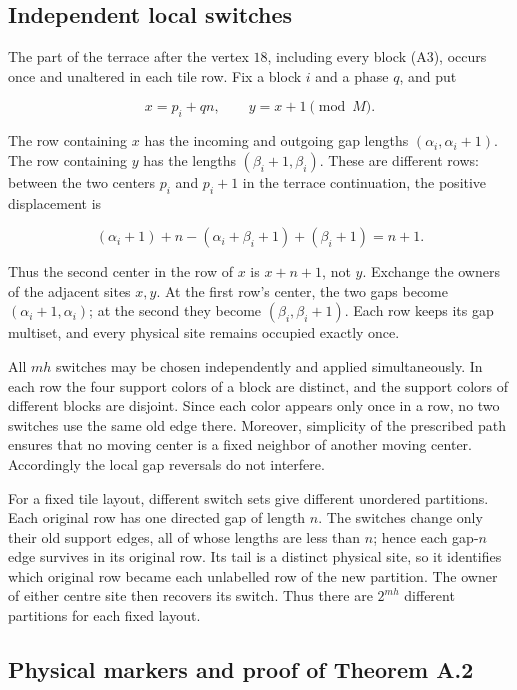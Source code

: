 \documentclass[11pt,a4paper]{article}
\begin{document}
\hypertarget{independent-local-switches}{%
\subsection{Independent local switches}\label{independent-local-switches}}

The part of the terrace after the vertex \(18\), including every block (A3), occurs once and unaltered in each tile row. Fix a block \(i\) and a phase \(q\), and put

\[
 x=p_i+qn,\qquad y=x+1\pmod M.
\]

The row containing \(x\) has the incoming and outgoing gap lengths \((\alpha_i,\alpha_i+1)\). The row containing \(y\) has the lengths \((\beta_i+1,\beta_i)\). These are different rows: between the two centers \(p_i\) and \(p_i+1\) in the terrace continuation, the positive displacement is

\[
 (\alpha_i+1)+n-(\alpha_i+\beta_i+1)+(\beta_i+1)=n+1.
\]

Thus the second center in the row of \(x\) is \(x+n+1\), not \(y\). Exchange the owners of the adjacent sites \(x,y\). At the first row's center, the two gaps become \((\alpha_i+1,\alpha_i)\); at the second they become \((\beta_i,\beta_i+1)\). Each row keeps its gap multiset, and every physical site remains occupied exactly once.

All \(mh\) switches may be chosen independently and applied simultaneously. In each row the four support colors of a block are distinct, and the support colors of different blocks are disjoint. Since each color appears only once in a row, no two switches use the same old edge there. Moreover, simplicity of the prescribed path ensures that no moving center is a fixed neighbor of another moving center. Accordingly the local gap reversals do not interfere.

For a fixed tile layout, different switch sets give different unordered partitions. Each original row has one directed gap of length \(n\). The switches change only their old support edges, all of whose lengths are less than \(n\); hence each gap-\(n\) edge survives in its original row. Its tail is a distinct physical site, so it identifies which original row became each unlabelled row of the new partition. The owner of either centre site then recovers its switch. Thus there are \(2^{mh}\) different partitions for each fixed layout.

\hypertarget{physical-markers-and-proof-of-theorem-a.2}{%
\subsection{Physical markers and proof of Theorem A.2}\label{physical-markers-and-proof-of-theorem-a.2}}
\end{document}
